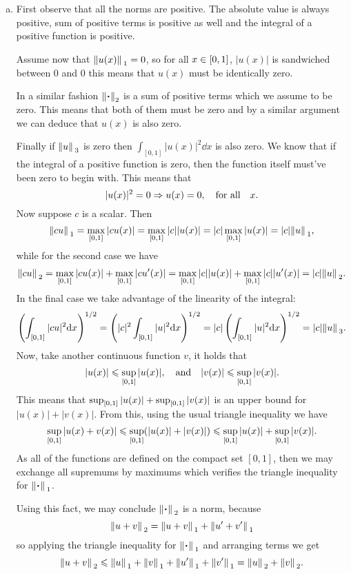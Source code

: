 \documentclass[12pt]{memoir}
\begin{document}
\begin{ptcbr}
\begin{enumerate}[(a)]
    \item First observe that all the norms are positive. The absolute value is always positive, sum of positive terms is positive as well and the integral of a positive function is positive.\par 
    Assume now that $\norm*{u(x)}_1=0$, so for all $x\in\left\lbrack0,1\right\rbrack$, $|u(x)|$ is sandwiched between $0$ and $0$ this means that $u(x)$ must be identically zero.\par 
    In a similar fashion $\norm{\.}_2$ is a sum of positive terms which we assume to be zero. This means that both of them must be zero and by a similar argument we can deduce that $u(x)$ is also zero.\par 
    Finally if $\norm*{u}_3$ is zero then $\int_{[0,1]}|u(x)|^2\dd x$ is also zero. We know that if the integral of a positive function is zero, then the function itself must've been zero to begin with. This means that 
    $$|u(x)|^2=0\Rightarrow u(x)=0,\quad\text{for all}\quad x.$$
    Now suppose $c$ is a scalar. Then 
    $$\norm*{cu}_1=\max_{\left\lbrack0,1\right\rbrack}|cu(x)|=\max_{\left\lbrack0,1\right\rbrack}|c||u(x)|=|c|\max_{\left\lbrack0,1\right\rbrack}|u(x)|=|c|\norm*{u}_1,$$
    while for the second case we have
    $$\norm*{cu}_2=\max_{\left\lbrack0,1\right\rbrack}|cu(x)|+\max_{\left\lbrack0,1\right\rbrack}|cu'(x)|=\max_{\left\lbrack0,1\right\rbrack}|c||u(x)|+\max_{\left\lbrack0,1\right\rbrack}|c||u'(x)|=|c|\norm*{u}_2.$$
    In the final case we take advantage of the linearity of the integral:
    $$\left(\int_{\left\lbrack0,1\right\rbrack}|cu|^2\dd x\right)^{1/2}=\left(|c|^2\int_{\left\lbrack0,1\right\rbrack}|u|^2\dd x\right)^{1/2}=|c|\left(\int_{\left\lbrack0,1\right\rbrack}|u|^2\dd x\right)^{1/2}=|c|\norm*{u}_3.$$
    Now, take another continuous function $v$, it holds that
    $$|u(x)|\leqslant\sup_{\left\lbrack0,1\right\rbrack}|u(x)|,\quad\text{and}\quad|v(x)|\leqslant\sup_{\left\lbrack0,1\right\rbrack}|v(x)|.$$
    This means that $\sup_{\left\lbrack0,1\right\rbrack}|u(x)|+\sup_{\left\lbrack0,1\right\rbrack}|v(x)|$ is an upper bound for $|u(x)|+|v(x)|$. From this, using the usual triangle inequality we have 
    $$\sup_{\left\lbrack0,1\right\rbrack}|u(x)+v(x)|\leqslant\sup_{\left\lbrack0,1\right\rbrack}(|u(x)|+|v(x)|)\leqslant\sup_{\left\lbrack0,1\right\rbrack}|u(x)|+\sup_{\left\lbrack0,1\right\rbrack}|v(x)|.$$
    As all of the functions are defined on the compact set $[0,1]$, then we may exchange all supremums by maximums which verifies the triangle inequality for $\norm*{\.}_1$.\par 
    Using this fact, we may conclude $\norm*{\.}_2$ is a norm, because
    $$\norm*{u+v}_2=\norm*{u+v}_1+\norm*{u'+v'}_1$$
    so applying the triangle inequality for $\norm*{\.}_1$ and arranging terms we get 
    $$\norm*{u+v}_2\leqslant\norm*{u}_1+\norm*{v}_1+\norm*{u'}_1+\norm*{v'}_1=\norm*{u}_2+\norm*{v}_2.$$

\end{enumerate}
\end{ptcbr}
\end{document}
